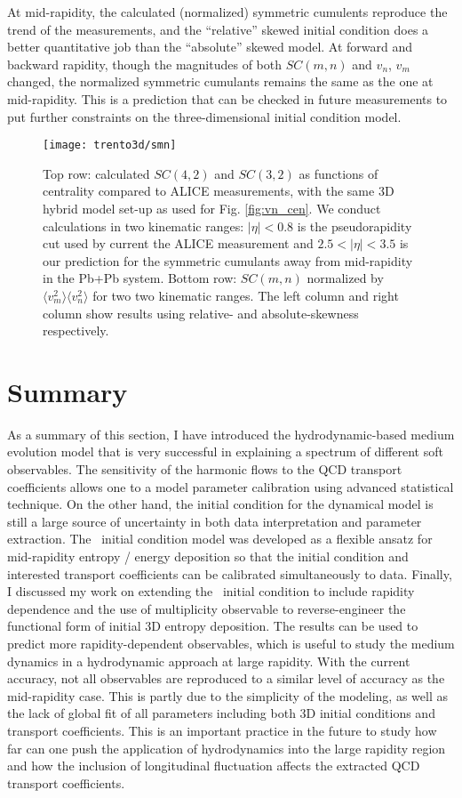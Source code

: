 At mid-rapidity, the calculated (normalized) symmetric cumulents reproduce the trend of the measurements, and the ``relative'' skewed initial condition does a better quantitative job than the ``absolute'' skewed model.
At forward and backward rapidity, though the magnitudes of both $SC(m,n)$ and $v_n$, $v_m$ changed, the normalized symmetric cumulants remains the same as the one at mid-rapidity.
This is a prediction that can be checked in future measurements to put further constraints on the three-dimensional initial condition model.

\begin{figure}
\texttt{[image: trento3d/smn]}
\caption{Top row: calculated $SC(4,2)$ and $SC(3,2)$ as functions of centrality compared to ALICE measurements, with the same 3D hybrid model set-up as used for Fig. \ref{fig:vn_cen}.
  We conduct calculations in two kinematic ranges: $|\eta|<0.8$ is the pseudorapidity cut used by current the ALICE measurement and $2.5<|\eta|<3.5$ is our prediction for the symmetric cumulants away from mid-rapidity in the Pb+Pb system.
  Bottom row: $SC(m,n)$ normalized by $\langle v_m^2\rangle\langle v_n^2\rangle$ for two two kinematic ranges.
  The left column and right column show results using relative- and absolute-skewness respectively.
}
\label{fig:trento:smn} 
\end{figure}

\section{Summary}
As a summary of this section, I have introduced the hydrodynamic-based  medium evolution model that is very successful in explaining a spectrum of different soft observables.
The sensitivity of the harmonic flows to the QCD transport coefficients allows one to a model parameter calibration using advanced statistical technique.
On the other hand, the initial condition for the dynamical model is still a large source of uncertainty in both data interpretation and parameter extraction.
The \trento\ initial condition model was developed as a flexible ansatz for mid-rapidity entropy / energy deposition so that the initial condition and interested transport coefficients can be calibrated simultaneously to data.
Finally, I discussed my work on extending the \trento\ initial condition to include rapidity dependence and the use of multiplicity observable to reverse-engineer the functional form of initial 3D entropy deposition.
The results can be used to predict more rapidity-dependent observables, which is useful to study the medium dynamics in a hydrodynamic approach at large rapidity.
With the current accuracy, not all observables are reproduced to a similar level of accuracy as the mid-rapidity case.
This is partly due to the simplicity of the modeling, as well as the lack of global fit of all parameters including both 3D initial conditions and transport coefficients.
This is an important practice in the future to study how far can one push the application of hydrodynamics into the large rapidity region and how the inclusion of longitudinal fluctuation affects the extracted QCD transport coefficients.